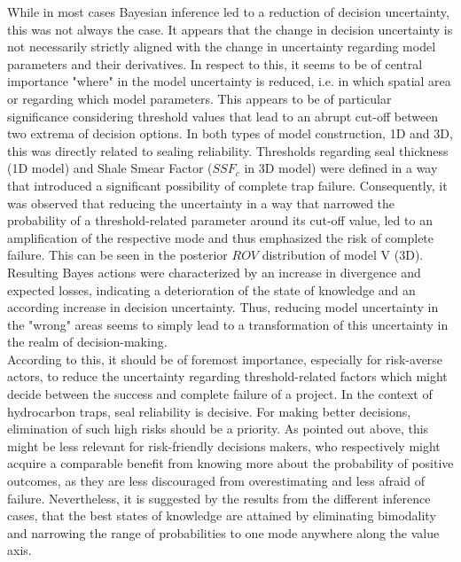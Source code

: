 	While in most cases Bayesian inference led to a reduction of decision uncertainty, this was not always the case. It appears that the change in decision uncertainty is not necessarily strictly aligned with the change in uncertainty regarding model parameters and their derivatives. In respect to this, it seems to be of central importance "where" in the model uncertainty is reduced, i.e. in which spatial area or regarding which model parameters. This appears to be of particular significance considering threshold values that lead to an abrupt cut-off between two extrema of decision options. In both types of model construction, 1D and 3D, this was directly related to sealing reliability. Thresholds regarding seal thickness (1D model) and Shale Smear Factor ($SSF_c$ in 3D model) were defined in a way that introduced a significant possibility of complete trap failure. Consequently, it was observed that reducing the uncertainty in a way that narrowed the probability of a threshold-related parameter around its cut-off value, led to an amplification of the respective mode and thus emphasized the risk of complete failure. This can be seen in the posterior $ROV$ distribution of model V (3D). Resulting Bayes actions were characterized by an increase in divergence and expected losses, indicating a deterioration of the state of knowledge and an according increase in decision uncertainty. Thus, reducing model uncertainty in the "wrong" areas seems to simply lead to a transformation of this uncertainty in the realm of decision-making.\\
	According to this, it should be of foremost importance, especially for risk-averse actors, to reduce the uncertainty regarding threshold-related factors which might decide between the success and complete failure of a project. In the context of hydrocarbon traps, seal reliability is decisive. For making better decisions, elimination of such high risks should be a priority. As pointed out above, this might be less relevant for risk-friendly decisions makers, who respectively might acquire a comparable benefit from knowing more about the probability of positive outcomes, as they are less discouraged from overestimating and less afraid of failure. Nevertheless, it is suggested by the results from the different inference cases, that the best states of knowledge are attained by eliminating bimodality and narrowing the range of probabilities to one mode anywhere along the value axis.\\
	
